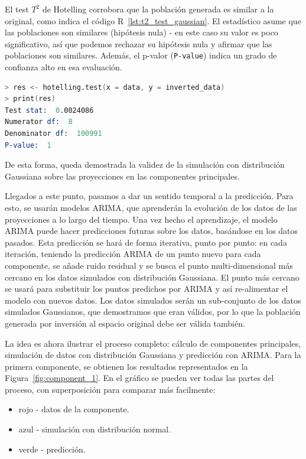\documentclass[11pt,spanish,listoffigures,listoftables]{tfgetsinf}
\begin{document}
    El test \(T^2\) de Hotelling corrobora que la población generada es similar a la original, como indica el código R~\ref{lst:t2_test_gaussian}. El estadístico asume que las poblaciones son similares (hipótesis nula) - en este caso su valor es poco significativo, así que podemos rechazar su hipótesis nula y afirmar que las poblaciones son similares. Además, el p-valor ({\tt P-value}) indica un grado de confianza alto en esa evaluación.
    
    \begin{lstlisting}[language=S, caption=Test \(T^2\) de Hotelling en R., label={lst:t2_test_gaussian}]
> res <- hotelling.test(x = data, y = inverted_data)
> print(res)
Test stat:  0.0024086 
Numerator df:  8 
Denominator df:  100991 
P-value:  1
    \end{lstlisting}
    
    De esta forma, queda demostrada la validez de la simulación con distribución Gaussiana sobre las proyecciones en las componentes principales.
        
    Llegados a este punto, pasamos a dar un sentido temporal a la predicción. Para esto, se usarán modelos ARIMA, que aprenderán la evolución de los datos de las proyecciones a lo largo del tiempo. Una vez hecho el aprendizaje, el modelo ARIMA puede hacer predicciones futuras sobre los datos, basándose en los datos pasados. Esta predicción se hará de forma iterativa, punto por punto: en cada iteración, teniendo la predicción ARIMA de un punto nuevo para cada componente, se añade ruido residual y se busca el punto multi-dimensional más cercano en los datos simulados con distribución Gaussiana. El punto más cercano se usará para substituir los puntos predichos por ARIMA y así re-alimentar el modelo con nuevos datos. Los datos simulados serán un sub-conjunto de los datos simulados Gaussianos, que demostramos que eran válidos, por lo que la población generada por inversión al espacio original debe ser válida también.
    
    La idea es ahora ilustrar el proceso completo: cálculo de componentes principales, simulación de datos con distribución Gaussiana y predicción con ARIMA. Para la primera componente, se obtienen los resultados representados en la Figura~\ref{fig:component_1}. En el gráfico se pueden ver todas las partes del proceso, con superposición para comparar más facilmente:
    \begin{itemize}
        \item rojo - datos de la componente.
        \item azul - simulación con distribución normal.
        \item verde - predicción.
    \end{itemize}
    
\end{document}
